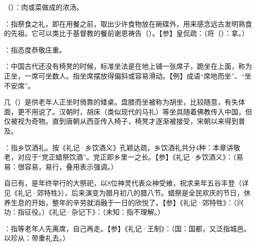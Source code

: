 {
\item {}（）：肉或菜做成的浓汤。
\item {}：指祭食之礼，即在用餐之前，取出少许食物放在碗碟外，用来感念远古发明熟食的先祖。它可以类比于基督教的餐前谢恩祷告（）。【参】皇侃疏：（将（）：拿。）
\item {}：指态度恭敬庄重。
}
{}


{
\item {}：中国古代还没有椅凳的时候，标准坐法是在地上铺一张席子，跪坐在上面，称为正坐，一席可坐数人。指坐席摆放得偏斜或容易滑动。【例】成语“席地而坐”、“坐不安席”。

几（）是供老年人正坐时倚靠的矮桌。盘膝而坐被称为胡坐，比较随意，有失体面，更不用说了。汉朝时，胡床（类似现代的马扎）等坐具随着佛教传入中国，但仅被视为奇物。直到唐朝从西亚传入椅子，椅凳才逐渐被接受，宋朝以来得到普及。
}
{}


{
\item {}：指乡饮酒礼。按《礼记·乡饮酒义》孔颖达疏，乡饮酒礼共分4种：本章讲敬老，对应于“党正蜡祭饮酒”。党正即乡里一之长。【参】《礼记·乡饮酒义》：（易易：很容易，易行，叠用表示强调。）

自已有，是年终举行的大祭祀，以8位神灵代表众神受飨，祝求来年五谷丰登（详见《礼记·郊特牲》），后来演变为腊月初八的腊八节。蜡祭是全民欢庆的节日，休养生息的开始，整年的辛劳就消融于一日的欣悦了。【参】《礼记·郊特牲》：（兴功：指征役。）《礼记·杂记下》：（未知：指不理解。）

\item {}：指等老年人先离席，自己再走。【参】《礼记·王制》：（国：国都，又泛指城邑。以珍从：带重礼去。）
}
{}


